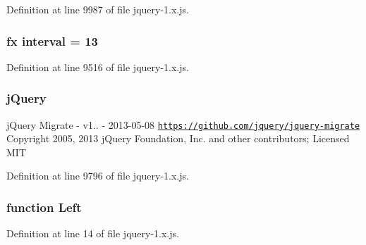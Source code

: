 Definition at line 9987 of file jquery-\/1.\+x.\+js.

\subsubsection[{\texorpdfstring{interval}{interval}}]{ {\bf fx} interval = 13}\hypertarget{jquery-1_8x_8js_a22f2d1dcf51c862e922248df75aaa9f7}{}\label{jquery-1_8x_8js_a22f2d1dcf51c862e922248df75aaa9f7}


Definition at line 9516 of file jquery-\/1.\+x.\+js.

\subsubsection[{\texorpdfstring{j\+Query}{jQuery}}]{\setlength{\rightskip}{0pt plus 5cm}j\+Query}\hypertarget{jquery-1_8x_8js_a2b1d6f9c448e3ce72f4e1865d6e38d2c}{}\label{jquery-1_8x_8js_a2b1d6f9c448e3ce72f4e1865d6e38d2c}
j\+Query Migrate -\/ v1.. -\/ 2013-\/05-\/08 \href{https://github.com/jquery/jquery-migrate}{\tt https\+://github.\+com/jquery/jquery-\/migrate} Copyright 2005, 2013 j\+Query Foundation, Inc. and other contributors; Licensed M\+IT 

Definition at line 9796 of file jquery-\/1.\+x.\+js.

\subsubsection[{\texorpdfstring{Left}{Left}}]{\setlength{\rightskip}{0pt plus 5cm}function Left}\hypertarget{jquery-1_8x_8js_abef68bf244a1159a49fe3a2c153a65d2}{}\label{jquery-1_8x_8js_abef68bf244a1159a49fe3a2c153a65d2}


Definition at line 14 of file jquery-\/1.\+x.\+js.

